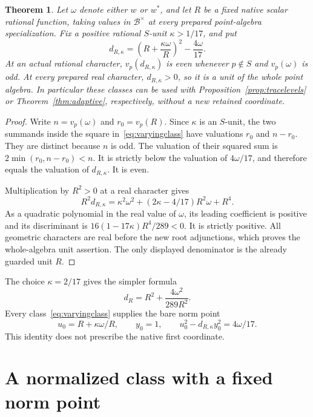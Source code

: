 \documentclass[11pt,a4paper]{article}
\newtheorem{theorem}{Theorem}[section]
\theoremstyle{definition}\newtheorem{definition}[theorem]{Definition}
\begin{document}
\begin{theorem}\label{thm:classes}
Let $\omega$ denote either $w$ or $w^*$, and let $R$ be a fixed
native scalar rational function, taking values in $\mathcal B^\times$
at every prepared point-algebra specialization. Fix a positive rational $S$-unit
$\kappa>1/17$, and put
\begin{equation}\label{eq:varyingclass}
 d_{R,\kappa}
     =\left(R+\frac{\kappa\omega}{R}\right)^2
                                      -\frac{4\omega}{17}.
\end{equation}
At an actual rational character, $v_p(d_{R,\kappa})$ is even
whenever $p\notin S$ and $v_p(\omega)$ is odd.
At every prepared real character, $d_{R,\kappa}>0$, so it is
a unit of the whole point algebra. In particular these classes
can be used with Proposition~\ref{prop:tracelevels} or
Theorem~\ref{thm:adaptive}, respectively, without a new retained
coordinate.
\end{theorem}
\begin{proof}
Write $n=v_p(\omega)$ and $r_0=v_p(R)$. Since $\kappa$ is an
$S$-unit, the two summands inside the square in~\eqref{eq:varyingclass}
have valuations $r_0$ and $n-r_0$. They are distinct because $n$
is odd. The valuation of their squared sum is
$2\min(r_0,n-r_0)<n$. It is strictly below the valuation of
$4\omega/17$, and therefore equals the valuation of
$d_{R,\kappa}$. It is even.

Multiplication by $R^2>0$ at a real character gives
\[
 R^2d_{R,\kappa}
    =\kappa^2\omega^2
       +(2\kappa-4/17)R^2\omega+R^4.
\]
As a quadratic polynomial in the real value of $\omega$, its
leading coefficient is positive and its discriminant is
$16(1-17\kappa)R^4/289<0$. It is strictly positive.
All geometric characters are real before the new root adjunctions,
which proves the whole-algebra unit assertion. The only displayed
denominator is the already guarded unit $R$.
\end{proof}

The choice $\kappa=2/17$ gives the simpler formula
\begin{equation}\label{eq:simplerclass}
                       d_R=R^2+\frac{4\omega^2}{289R^2}.
\end{equation}
Every class~\eqref{eq:varyingclass} supplies the bare norm point
\[
        u_0=R+\kappa\omega/R,\qquad y_0=1,
        \qquad u_0^2-d_{R,\kappa}y_0^2=4\omega/17.
\]
This identity does not prescribe the native first coordinate.

\section{A normalized class with a fixed norm point}
\end{document}
